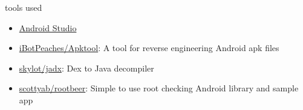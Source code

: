 \documentclass{beamer}
\begin{document}
\begin{frame}{tools used}

    \begin{itemize}
        \item \href{https://developer.android.com/studio}{Android Studio}
        \item \href{https://github.com/iBotPeaches/Apktool}{iBotPeaches/Apktool}:
        A tool for reverse engineering Android apk files
        \item \href{https://github.com/skylot/jadx}{skylot/jadx}: Dex to Java decompiler
        \item \href{https://github.com/scottyab/rootbeer}{scottyab/rootbeer}: Simple to use root checking Android library and sample app
    \end{itemize}
    
\end{frame}
\end{document}
